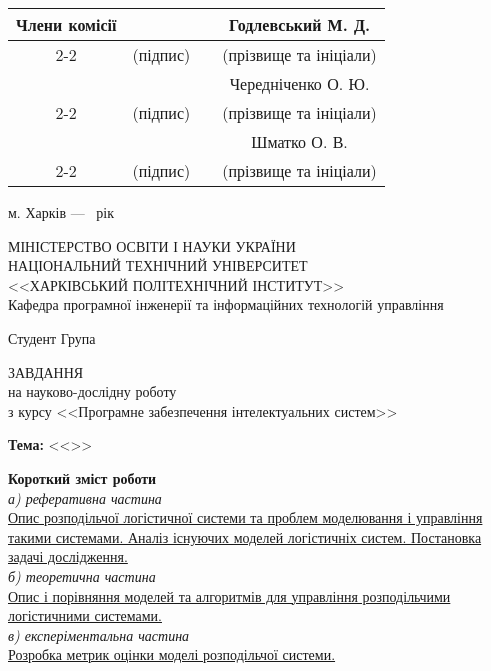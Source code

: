 {\begin{titlepage}
	\begin{flushright}
		\small
		\newcommand{\member}[1]{
			& \hspace{4cm} & & #1 \\ \cline{2-2} \cline{4-4} 
			& {\footnotesize (підпис)} & & {\footnotesize (прізвище та ініціали)}  \\
		}
		\begin{tabular}{cccc}
			Члени комісії 
			\member{Годлевський М. Д.}
			\member{Чередніченко О. Ю.}
			\member{Шматко О. В.}
		\end{tabular}
	\end{flushright}
	
	\vspace*{\fill}

	\begin{center}
		м. Харків --- \the\year~рік
	\end{center}
\end{titlepage}

\begin{titlepage}
	\begin{center}
		МІНІСТЕРСТВО ОСВІТИ І НАУКИ УКРАЇНИ \\
		НАЦІОНАЛЬНИЙ ТЕХНІЧНИЙ УНІВЕРСИТЕТ \\
		<<ХАРКІВСЬКИЙ ПОЛІТЕХНІЧНИЙ ІНСТИТУТ>> \\
		Кафедра програмної інженерії та інформаційних технологій управління
	\end{center}
	\noindent
	Студент \suline{\theauthor} \hfill Група 

	\vspace*{\fill}

	\begin{center}
		\MakeUppercase{Завдання} \\
		на науково-дослідну роботу \\
		з курсу <<Програмне забезпечення інтелектуальних систем>>
	\end{center}
	\noindent
	\textbf{Тема:} <<\thetitle>>
	
	\vspace*{\fill}

	\begin{addmargin}[0cm]{1.5cm} 
		\textbf{Короткий зміст роботи} \\
		\textit{а) реферативна частина} \\
		\uline{
		Опис розподільчої логістичної системи та проблем моделювання і управління такими системами. 
		Аналіз існуючих моделей логістичніх систем.
		Постановка задачі дослідження.
		} \\
		\textit{б) теоретична частина} \\
		\uline{
		Опис і порівняння моделей та алгоритмів для управління розподільчими логістичними системами.
		} \\
		\textit{в) експеріментальна частина} \\
		\uline{
		Розробка метрик оцінки моделі розподільчої системи.
		}
	\end{addmargin}
	

\end{titlepage}}
